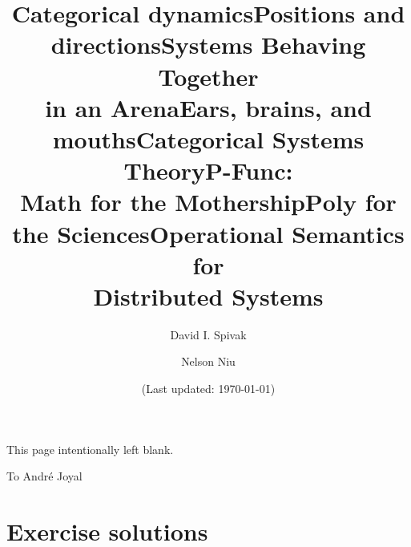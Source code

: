 \documentclass[11pt, book]{memoir}
\newcommand{\titlefont}{\normalfont\Huge\bfseries}
\theoremstyle{plain}
\theoremstyle{plain}
\theoremstyle{remark}
\newcommand{\Cat}[1]{\textbf{#1}}%
\newenvironment{dedication}
     {\hfill}
     {}
\newcommand{\poly}[1][]{#1\Cat{Poly}}
\newcommand{\0}{\textsf{0}}
\newcommand{\1}{\textsf{1}}
\newcommand{\2}{\textsf{2}}
\newcommand{\3}{\textsf{3}}
\newcommand{\4}{\textsf{4}}
\newcommand{\5}{\textsf{5}}
\newcommand{\6}{\textsf{6}}
\newcommand{\7}{\textsf{7}}
\newcommand{\8}{\textsf{8}}
\newcommand{\9}{\textsf{9}}
\begin{document}
\frontmatter

\title{\titlefont Categorical dynamics}
\title{\titlefont Positions and directions}
\title{\titlefont Systems Behaving Together\\in an Arena}
\title{\titlefont Ears, brains, and mouths}
\title{\titlefont Categorical Systems Theory}
\title{\titlefont P-Func:\\\bigskip\medskip\huge Math for the Mothership}
\title{\titlefont $\poly$ for the Sciences}
\title{\titlefont Operational Semantics for\\\medskip Distributed Systems}

\author{
\LARGE  David I. Spivak 
\and
\LARGE Nelson Niu 
\normalsize}




\posttitle{
\vspace{.8in}
\normalsize
\[
\coverpic
\]
  \vspace{.5in}
  \endgroup
}
\date{\vfill (Last updated: \today)}



\maketitle


\thispagestyle{empty}
\clearpage
This page intentionally left blank.
\clearpage

\begin{dedication}
To Andr\'e Joyal
\end{dedication}


\clearpage
\tableofcontents*
\clearpage



\mainmatter




\appendix
\begingroup
\footnotesize

% 
\chapter{Exercise solutions}




\backmatter

\printbibliography
\printindex
\end{document}
